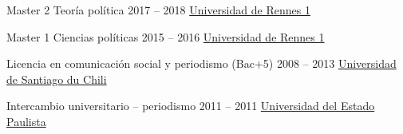 \begin{yearlist}

\item[Master 2 Teoría política ]{2017 -- 2018}
     {\href{https://formations.univ-rennes1.fr/formations/master-2-theorie-politique}{Universidad de Rennes 1}}
		 {}
     

\item[Master 1 Ciencias políticas ]{2015 -- 2016}
     {\href{https://formations.univ-rennes1.fr/formations/master-1-science-politique}{Universidad de Rennes 1}}
		 {}


\item[Licencia en comunicación social y periodismo (Bac+5)]{2008 -- 2013}
     {\href{http://periodismo.usach.cl/} {Universidad de Santiago du Chili}}
		 {}


\item[Intercambio universitario -- periodismo ]{2011 -- 2011}
     {\href{http://www.unesp.br/} {Universidad del Estado \\ Paulista}}
		 {}


\end{yearlist}





%
%




